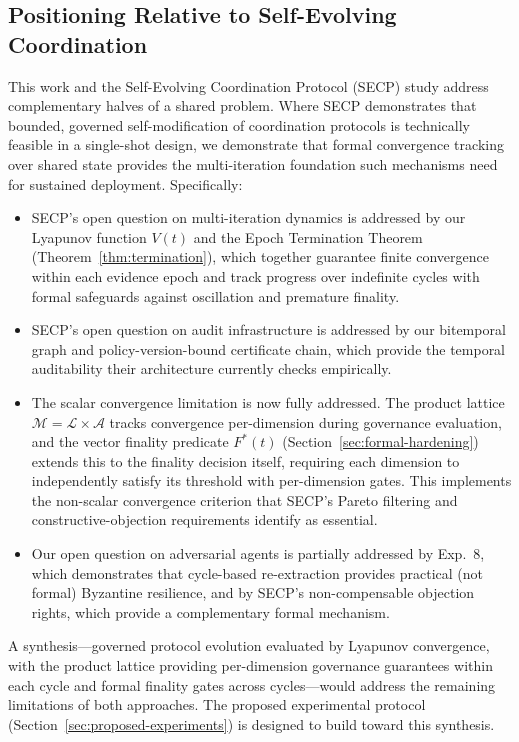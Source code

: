 \documentclass[11pt]{article}
\begin{document}
\subsection{Positioning Relative to Self-Evolving Coordination}

This work and the Self-Evolving Coordination Protocol (SECP) study \cite{delachica2026} address complementary halves of a shared problem. Where SECP demonstrates that bounded, governed self-modification of coordination protocols is technically feasible in a single-shot design, we demonstrate that formal convergence tracking over shared state provides the multi-iteration foundation such mechanisms need for sustained deployment. Specifically:

\begin{itemize}
  \item SECP's open question on multi-iteration dynamics is addressed by our Lyapunov function $V(t)$ and the Epoch Termination Theorem (Theorem~\ref{thm:termination}), which together guarantee finite convergence within each evidence epoch and track progress over indefinite cycles with formal safeguards against oscillation and premature finality.
  \item SECP's open question on audit infrastructure is addressed by our bitemporal graph and policy-version-bound certificate chain, which provide the temporal auditability their architecture currently checks empirically.
  \item The scalar convergence limitation is now fully addressed. The product lattice $\mathcal{M} = \mathcal{L} \times \mathcal{A}$ tracks convergence per-dimension during governance evaluation, and the vector finality predicate $F^*(t)$ (Section~\ref{sec:formal-hardening}) extends this to the finality decision itself, requiring each dimension to independently satisfy its threshold with per-dimension gates. This implements the non-scalar convergence criterion that SECP's Pareto filtering and constructive-objection requirements identify as essential.
  \item Our open question on adversarial agents is partially addressed by Exp.~8, which demonstrates that cycle-based re-extraction provides practical (not formal) Byzantine resilience, and by SECP's non-compensable objection rights, which provide a complementary formal mechanism.
\end{itemize}

A synthesis---governed protocol evolution evaluated by Lyapunov convergence, with the product lattice providing per-dimension governance guarantees within each cycle and formal finality gates across cycles---would address the remaining limitations of both approaches. The proposed experimental protocol (Section~\ref{sec:proposed-experiments}) is designed to build toward this synthesis.
\end{document}
